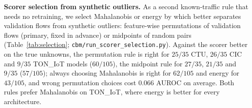 \documentclass[journal]{IEEEtran}
\begin{document}
\textbf{Scorer selection from synthetic outliers.} As a second known-traffic rule that needs no
retraining, we select Mahalanobis or energy by which better separates validation flows from
synthetic outliers: feature-wise permutations of validation flows (primary, fixed in advance) or
midpoints of random pairs (Table~\ref{tab:selection}; \texttt{cbm/run\_scorer\_selection.py}). Against
the scorer better on the true unknowns, the permutation rule is right for $25/35$ CTU, $26/35$ CIC
and $9/35$ TON\_IoT models ($60/105$), the midpoint rule for $27/35$, $21/35$ and $9/35$ ($57/105$);
always choosing Mahalanobis is right for $62/105$ and energy for $43/105$, and wrong permutation
choices cost $0.066$ AUROC on average. Both rules prefer Mahalanobis on TON\_IoT, where energy is
better for every architecture.

\begin{table}[t]
\centering\footnotesize
\caption{Scorer selection from synthetic outliers (five seeds). True: OOD AUROC on the held-out
unknown families; Perm.: AUROC separating validation flows from feature-permuted copies;
Correct: seeds on which the rule picks the scorer that is better on the true unknowns
(permutation / midpoint rule).}
\label{tab:selection}
\setlength{\tabcolsep}{3pt}
\end{table}
\end{document}
